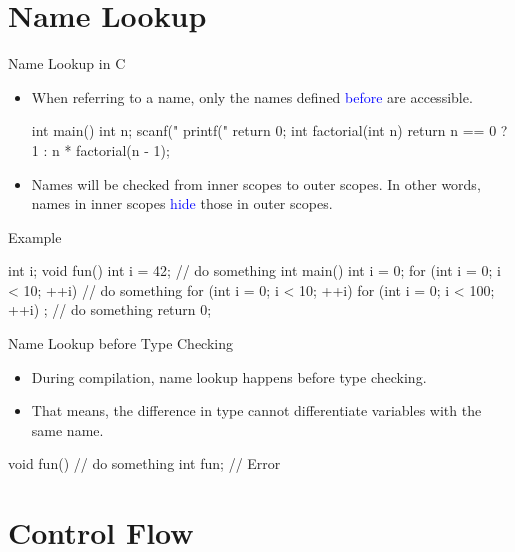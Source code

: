 \documentclass[handout]{beamer}
\newcommand{\blue}[1]{\textcolor{blue}{#1}}
\begin{document}
\section{Name Lookup}

\begin{frame}[fragile]{Name Lookup in C}
	\begin{itemize}
		\item When referring to a name, only the names defined \blue{before} are accessible.
		\begin{cpp}
int main() {
  int n; scanf("%
  printf("%
  return 0;
}
int factorial(int n) {
  return n == 0 ? 1 : n * factorial(n - 1);
}
		\end{cpp}
		\item Names will be checked from inner scopes to outer scopes. In other words, names in inner scopes \blue{hide} those in outer scopes.
	\end{itemize}
\end{frame}

\begin{frame}[fragile]{Example}
	\begin{cpp}
int i;
void fun() {
  int i = 42;
  // do something
}
int main() {
  int i = 0;
  for (int i = 0; i < 10; ++i) {
    // do something
  }
  for (int i = 0; i < 10; ++i)
    for (int i = 0; i < 100; ++i)
      ; // do something
  return 0;
}
	\end{cpp}
\end{frame}

\begin{frame}[fragile]{Name Lookup before Type Checking}
	\begin{itemize}
		\item During compilation, name lookup happens before type checking.
		\item That means, the difference in type cannot differentiate variables with the same name.
	\end{itemize}
	\begin{cpp}
void fun() {
  // do something
}
int fun; // Error
	\end{cpp}
\end{frame}

\section{Control Flow}
\end{document}
